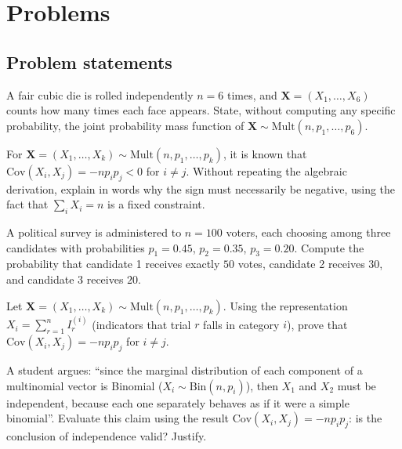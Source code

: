 \section*{Problems}

\subsection*{Problem statements}

\begin{problema}
	\label{prob:2499194}
	A fair cubic die is rolled independently $n=6$ times, and $\bm{X}=(X_1,\dots,X_6)$ counts how many times each face appears. State, without computing any specific probability, the joint probability mass function of $\bm{X} \sim \text{Mult}(n,p_1,\dots,p_6)$.
\end{problema}

\begin{problema}
	\label{prob:97df06e}
	For $\bm{X}=(X_1,\dots,X_k)\sim\text{Mult}(n,p_1,\dots,p_k)$, it is known that $\text{Cov}(X_i,X_j) = -np_ip_j < 0$ for $i\neq j$. Without repeating the algebraic derivation, explain in words why the sign must necessarily be negative, using the fact that $\sum_i X_i = n$ is a fixed constraint.
\end{problema}

\begin{problema}
	\label{prob:33bf5d2}
	A political survey is administered to $n=100$ voters, each choosing among three candidates with probabilities $p_1=0.45$, $p_2=0.35$, $p_3=0.20$. Compute the probability that candidate 1 receives exactly $50$ votes, candidate 2 receives $30$, and candidate 3 receives $20$.
\end{problema}

\begin{problema}
	\label{prob:277341a}
	Let $\bm{X}=(X_1,\dots,X_k)\sim\text{Mult}(n,p_1,\dots,p_k)$. Using the representation $X_i=\sum_{r=1}^n I_r^{(i)}$ (indicators that trial $r$ falls in category $i$), prove that $\text{Cov}(X_i,X_j) = -np_ip_j$ for $i\neq j$.
\end{problema}

\begin{problema}
	\label{prob:81748ff}
	A student argues: ``since the marginal distribution of each component of a multinomial vector is Binomial ($X_i \sim \text{Bin}(n,p_i)$), then $X_1$ and $X_2$ must be independent, because each one separately behaves as if it were a simple binomial''. Evaluate this claim using the result $\text{Cov}(X_i,X_j)=-np_ip_j$: is the conclusion of independence valid? Justify.
\end{problema}

